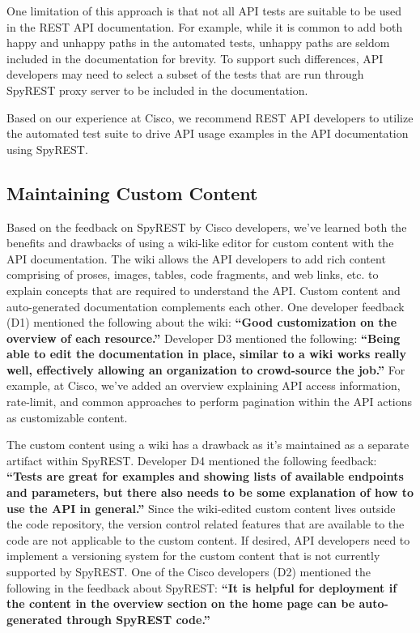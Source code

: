 \documentclass[10pt, conference]{IEEEtran}
\begin{document}
One limitation of this approach is that not all API tests are suitable to be used in the REST API documentation. For example, while it is common to add both happy and unhappy paths in the automated tests, unhappy paths are seldom included in the documentation for brevity. To support such differences, API developers may need to select a subset of the tests that are run through SpyREST proxy server to be included in the documentation.

Based on our experience at Cisco, we recommend REST API developers to utilize the automated test suite to drive API usage examples in the API documentation using SpyREST.

\subsection{Maintaining Custom Content}
Based on the feedback on SpyREST by Cisco developers, we've learned both the benefits and drawbacks of using a wiki-like editor for custom content with the API documentation. The wiki allows the API developers to add rich content comprising of proses, images, tables, code fragments, and web links, etc. to explain concepts that are required to understand the API. Custom content and auto-generated documentation complements each other. One developer feedback (D1) mentioned the following about the wiki: \textbf{``Good customization on the overview of each resource.''} Developer D3 mentioned the following: \textbf{``Being able to edit the documentation in place, similar to a wiki works really well, effectively allowing an organization to crowd-source the job.''} For example, at Cisco, we've added an overview explaining API access information, rate-limit, and common approaches to perform pagination within the API actions as customizable content.

The custom content using a wiki has a drawback as it's maintained as a separate artifact within SpyREST. Developer D4 mentioned the following feedback: \textbf{``Tests are great for examples and showing lists of available endpoints and parameters, but there also needs to be some explanation of how to use the API in general.''} Since the wiki-edited custom content lives outside the code repository, the version control related features that are available to the code are not applicable to the custom content. If desired, API developers need to implement a versioning system for the custom content that is not currently supported by SpyREST. One of the Cisco developers (D2) mentioned the following in the feedback about SpyREST: \textbf{``It is helpful for deployment if the content in the overview section on the home page can be auto-generated through SpyREST code.''}
\end{document}
